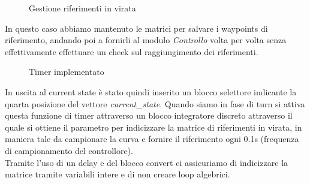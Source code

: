\documentclass{article}
\begin{document}
            \begin{figure} [ht]
                \caption{Gestione riferimenti in virata}
                \label{fig:virate}
            \end{figure}

            In questo caso abbiamo mantenuto le matrici per salvare i waypoints di riferimento, andando poi a fornirli al 
            modulo \emph{Controllo} volta per volta senza effettivamente effettuare un check sul raggiungimento dei riferimenti.

            \begin{figure} [ht]
                \caption{Timer implementato}
                \label{fig:timer}
            \end{figure}

            
            In uscita al current state è stato quindi inserito un blocco selettore indicante la quarta posizione del vettore \emph{current\_state}.
            Quando siamo in fase di turn si attiva questa funzione di timer attraverso un blocco integratore 
            discreto attraverso il quale si ottiene il parametro per indicizzare la matrice di riferimenti in virata, in maniera tale da campionare la curva e 
            fornire il riferimento ogni 0.1s (frequenza di campionamento del controllore).\\
            Tramite l'uso di un delay e del blocco convert ci assicuriamo di indicizzare la matrice tramite variabili intere e di non creare loop algebrici. 
\end{document}
